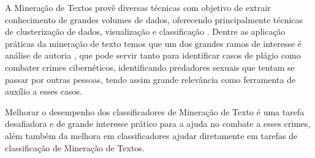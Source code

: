 
A Mineração de Textos provê diversas técnicas com objetivo de extrair conhecimento de grandes volumes de dados, oferecendo principalmente técnicas de clusterização de dados, visualização e classificação \cite{Sammut2017EMLDM}. 
Dentre as aplicação práticas da mineração de texto temos que um dos grandes ramos de interesse é análise de autoria \cite{Berry2010TMAT}, que pode servir tanto para identificar casos de plágio como combater crimes cibernéticos, identificando predadores sexuais que tentam se passar por outras pessoas, tendo assim grande relevância como ferramenta de auxílio a esses casos.

Melhorar o desempenho dos classificadores de Mineração de Texto é uma tarefa desafiadora e de grande interesse prático para a ajuda no combate a esses crimes\cite{Berry2010TMAT}, além também da melhora em classificadores ajudar diretamente em tarefas de classificação de Mineração de Textos.
